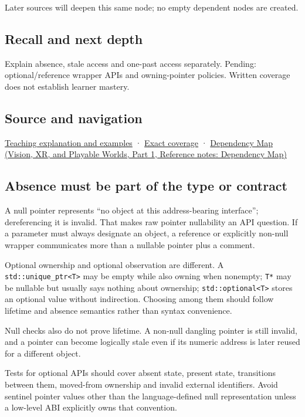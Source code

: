 Later sources will deepen this same node; no empty dependent nodes are created.

\subsection{Recall and next depth}\label{appendix-afae48c31800-recall-and-next-depth}

\hypertarget{appendix-afae48c31800-recall-and-next-depth}{}

Explain absence, stale access and one-past access separately. Pending: optional/reference wrapper APIs and owning-pointer policies. Written coverage does not establish learner mastery.

\subsection{Source and navigation}\label{appendix-afae48c31800-source-and-navigation}

\hypertarget{appendix-afae48c31800-source-and-navigation}{}

\hyperref[01-foundations-i-ch003-a-pointer-carries-an-access-contract]{Teaching explanation and examples} · \hyperref[appendix-fd090d982a15-m008---parts-113-126]{Exact coverage} · \href{../07-Vision-XR-and-Playable-Worlds-P01/main.pdf\#nameddest=appendix-4ad47bdd269a}{Dependency Map (Vision, XR, and Playable Worlds, Part 1, Reference notes: Dependency Map)}

\subsection{Absence must be part of the type or contract}\label{appendix-afae48c31800-absence-must-be-part-of-the-type-or-contract}

\hypertarget{appendix-afae48c31800-absence-must-be-part-of-the-type-or-contract}{}

A null pointer represents ``no object at this address-bearing interface''; dereferencing it is invalid. That makes raw pointer nullability an API question. If a parameter must always designate an object, a reference or explicitly non-null wrapper communicates more than a nullable pointer plus a comment.

Optional ownership and optional observation are different. A \texttt{std::unique\_ptr\textless{}T\textgreater{}} may be empty while also owning when nonempty; \texttt{T*} may be nullable but usually says nothing about ownership; \texttt{std::optional\textless{}T\textgreater{}} stores an optional value without indirection. Choosing among them should follow lifetime and absence semantics rather than syntax convenience.

Null checks also do not prove lifetime. A non-null dangling pointer is still invalid, and a pointer can become logically stale even if its numeric address is later reused for a different object.

Tests for optional APIs should cover absent state, present state, transitions between them, moved-from ownership and invalid external identifiers. Avoid sentinel pointer values other than the language-defined null representation unless a low-level ABI explicitly owns that convention.
